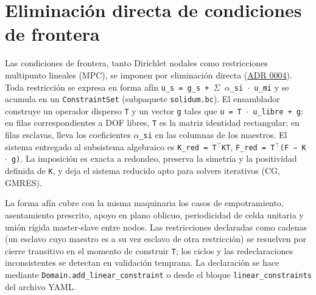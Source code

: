 \documentclass[11pt,oneside]{report}
\begin{document}
\section{Eliminación directa de condiciones de frontera}

Las condiciones de frontera, tanto Dirichlet nodales como restricciones multipunto lineales (MPC), se imponen por eliminación directa (\hyperref[adr:0004]{ADR 0004}). Toda restricción se expresa en forma afín \texttt{u\_\allowbreak{}s = g\_\allowbreak{}s + \ensuremath{\Sigma} \ensuremath{\alpha}\_\allowbreak{}si \ensuremath{\cdot} u\_\allowbreak{}mi} y se acumula en un \texttt{ConstraintSet} (subpaquete \texttt{solidum.bc}). El ensamblador construye un operador disperso \texttt{T} y un vector \texttt{g} tales que \texttt{u = T \ensuremath{\cdot} u\_\allowbreak{}libre + g}: en filas correspondientes a DOF libres, \texttt{T} es la matriz identidad rectangular; en filas esclavas, lleva los coeficientes \texttt{\ensuremath{\alpha}\_si} en las columnas de los maestros. El sistema entregado al subsistema algebraico es \texttt{K\_red = T\ensuremath{^{\top}}KT}, \texttt{F\_\allowbreak{}red = T\ensuremath{^{\top}}(F − K \ensuremath{\cdot} g)}. La imposición es exacta a redondeo, preserva la simetría y la positividad definida de \texttt{K}, y deja el sistema reducido apto para solvers iterativos (CG, GMRES).

La forma afín cubre con la misma maquinaria los casos de empotramiento, asentamiento prescrito, apoyo en plano oblicuo, periodicidad de celda unitaria y unión rígida master-slave entre nodos. Las restricciones declaradas como cadenas (un esclavo cuyo maestro es a su vez esclavo de otra restricción) se resuelven por cierre transitivo en el momento de construir \texttt{T}; los ciclos y las redeclaraciones inconsistentes se detectan en validación temprana. La declaración se hace mediante \texttt{Domain.\allowbreak{}add\_\allowbreak{}linear\_\allowbreak{}constraint} o desde el bloque \texttt{linear\_\allowbreak{}constraints} del archivo YAML.
\end{document}
